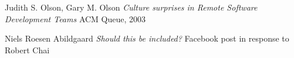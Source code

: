 \begin{thebibliography}{9}

		Judith S. Olson, Gary M. Olson\newline
		\emph{Culture surprises in Remote Software Development Teams}\newline
		ACM Queue, 2003

		Niels Roesen Abildgaard\newline
		\emph{Should this be included?}\newline
		Facebook post in response to Robert Chai

\end{thebibliography}
